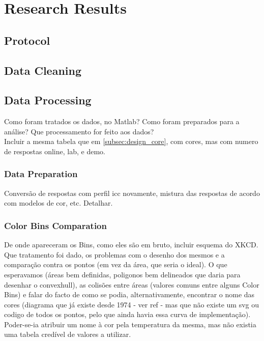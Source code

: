 
\chapter{Research Results}
\label{chapter:results}

\section{Protocol}
\label{sec:results_protocol}

\section{Data Cleaning}
\label{sec:results_datacleaning}

\section{Data Processing}
\label{sec:results_digest}
%
Como foram tratados os dados, no Matlab? Como foram preparados para a análise?
Que processamento for feito aos dados? \\
Incluir a mesma tabela que em \ref{subsec:design_core}, com cores, mas com numero de respostas online, lab, e demo.
%
\subsection{Data Preparation}
\label{subsec:results_preparation}
%
Conversão de respostas com perfil icc novamente, mistura das respostas de acordo com modelos de cor, etc.
Detalhar.
%
\subsection{Color Bins Comparation}
\label{subsec:results_preparation}
%
De onde apareceram os Bins, como eles são em bruto, incluir esquema do XKCD. Que tratamento foi dado, os problemas
com o desenho dos mesmos e a comparação contra os pontos (em vez da área, que seria o ideal). O que esperavamos
(áreas bem definidas, poligonos bem delineados que daria para desenhar o convexhull), as colisões entre áreas (valores
comuns entre alguns Color Bins) e falar do facto de como se podia, alternativamente, encontrar o nome das cores (diagrama
que já existe desde 1974 - ver ref - mas que não existe um svg ou codigo de todos os pontos, pelo que ainda havia essa curva
de implementação). Poder-se-ia atribuir um nome à cor pela temperatura da mesma, mas não existia uma tabela credível de valores
a utilizar.
%
